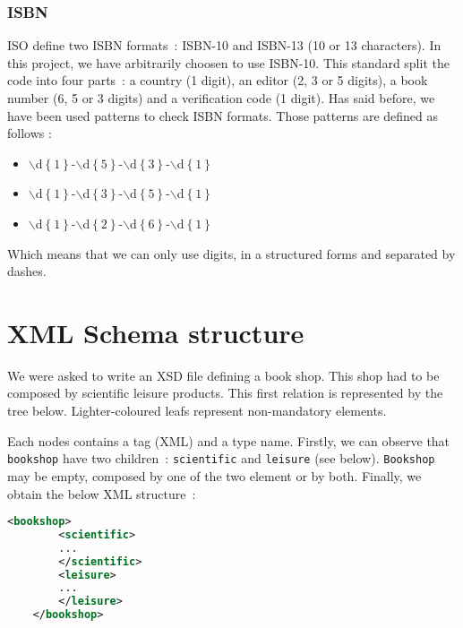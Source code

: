 \documentclass{article}
\begin{document}
  \subsubsection{ISBN}
    \label{sec:isbn}
    ISO define two ISBN formats~: ISBN-10 and ISBN-13 (10 or 13 characters). In this project, we have arbitrarily choosen to use ISBN-10. This standard split the code into four parts~: a country (1 digit), an editor (2, 3 or 5 digits), a book number (6, 5 or 3 digits) and a verification code (1 digit). Has said before, we have been used patterns to check ISBN formats. Those patterns are defined as follows : 
    \begin{itemize}
    \item $\backslash$d$\left\{ 1\right\}$-$\backslash$d$\left\{ 5 \right\}$-$\backslash$d$\left\{ 3 \right\}$-$\backslash$d$\left\{ 1 \right\}$
    \item $\backslash$d$\left\{ 1 \right\}$-$\backslash$d$\left\{ 3 \right\}$-$\backslash$d$\left\{ 5 \right\}$-$\backslash$d$\left\{ 1 \right\}$
    \item $\backslash$d$\left\{ 1 \right\}$-$\backslash$d$\left\{ 2 \right\}$-$\backslash$d$\left\{ 6 \right\}$-$\backslash$d$\left\{ 1 \right\}$
    \end{itemize}
    Which means that we can only use digits, in a structured forms and separated by dashes.
  
  
\section{XML Schema structure}
We were asked to write an XSD file defining a book shop. This shop had to be composed by scientific leisure products. This first relation is represented by the tree below. Lighter-coloured leafs represent non-mandatory elements.
  \begin{center}
  \end{center}
  Each nodes contains a tag (XML) and a type name. Firstly, we can observe that \verb|bookshop| have two children~: \verb|scientific| and \verb|leisure| (see below). \verb|Bookshop| may be empty, composed by one of the two element or by both. Finally, we obtain the below XML structure~:
  \begin{lstlisting}[language=XML]
    <bookshop>
        <scientific>
	    ...
        </scientific>
        <leisure>
	    ...
        </leisure>
    </bookshop>
  \end{lstlisting}
\end{document}
